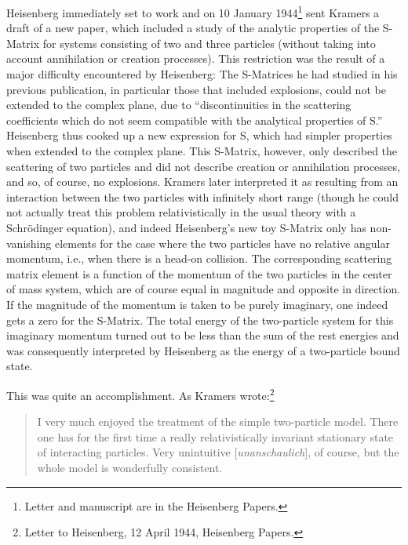 \documentclass[12pt,a4paper]{article}
\begin{document}
Heisenberg immediately set to work and on 10 January 1944\footnote{Letter and manuscript are in the Heisenberg Papers.} sent Kramers a draft of a new paper, which included a study of the analytic properties of the S-Matrix for systems consisting of two and three particles (without taking into account annihilation or creation processes). This restriction was the result of a major difficulty encountered by Heisenberg: The S-Matrices he had studied in his previous publication, in particular those that included explosions, could not be extended to the complex plane, due to ``discontinuities in the scattering coefficients which do not seem compatible with the analytical properties of S.'' Heisenberg thus cooked up a new expression for S, which had simpler properties when extended to the complex plane. This S-Matrix, however, only described the scattering of two particles and did not describe creation or annihilation processes, and so, of course, no explosions. Kramers later interpreted it as resulting from an interaction between the two particles with infinitely short range (though he could not actually treat this problem relativistically in the usual theory with a Schr\"{o}dinger equation), and indeed Heisenberg's new toy S-Matrix only has non-vanishing elements for the case where the two particles have no relative angular momentum, i.e., when there is a head-on collision. The corresponding scattering matrix element is a function of the momentum of the two particles in the center of mass system, which are of course equal in magnitude and opposite in direction. If the magnitude of the momentum is taken to be purely imaginary, one indeed gets a zero for the S-Matrix. The total energy of the two-particle system for this imaginary momentum turned out to be less than the sum of the rest energies and was consequently interpreted by Heisenberg as the energy of a two-particle bound state. 

This was quite an accomplishment. As Kramers wrote:\footnote{Letter to Heisenberg, 12 April 1944, Heisenberg Papers.}

\begin{quote}
I very much enjoyed the treatment of the simple two-particle model. There one has for the first time a really relativistically invariant stationary state of interacting particles. Very unintuitive [\emph{unanschaulich}], of course, but the whole model is wonderfully consistent.
\end{quote}
\end{document}
